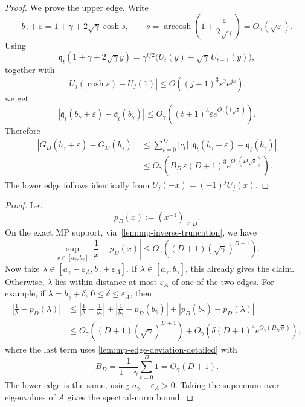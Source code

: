 \documentclass[12pt]{article}
\newcommand{\gam}{\gamma}
\DeclareMathOperator{\arccosh}{arccosh}
\newcommand{\q}{\mathfrak q}
\begin{document}
\begin{proof}
We prove the upper edge. Write
\[
    b_\gam+\varepsilon
    =
    1+\gam+2\sqrt{\gam}\cosh s,
    \qquad
    s=\arccosh\!\left(1+\frac{\varepsilon}{2\sqrt{\gam}}\right)
    =
    O_\gam(\sqrt{\varepsilon}).
\]
Using
\[
    \q_t(1+\gam+2\sqrt{\gam}y)
    =
    \gam^{t/2}\bigl(U_t(y)+\sqrt{\gam}\,U_{t-1}(y)\bigr),
\]
together with
\[
    |U_j(\cosh s)-U_j(1)|
    \le
    O\!\left((j+1)^3s^2 e^{js}\right),
\]
we get
\[
    |\q_t(b_\gam+\varepsilon)-\q_t(b_\gam)|
    \le
    O_\gam\!\left(
        (t+1)^3\varepsilon e^{O_\gam(t\sqrt{\varepsilon})}
    \right).
\]
Therefore
\[
\begin{aligned}
    |G_D(b_\gam+\varepsilon)-G_D(b_\gam)|
    &\le
    \sum_{t=0}^D |c_t|\,
    |\q_t(b_\gam+\varepsilon)-\q_t(b_\gam)| \\
    &\le
    O_\gam\!\left(
        B_D\,\varepsilon (D+1)^3 e^{O_\gam(D\sqrt{\varepsilon})}
    \right).
\end{aligned}
\]
The lower edge follows identically from \(U_j(-x)=(-1)^jU_j(x)\).
\end{proof}

\mpinverseedgefluctuation*
\begin{proof}
Let
\[
    p_D(x):=(x^{-1})_{\le D}.
\]
On the exact MP support, via~\cref{lem:mp-inverse-truncation}, we have
\[
    \sup_{x\in[a_\gam,b_\gam]}
    \left|
        \frac1x-p_D(x)
    \right|
    \le
    O_\gam\!\left((D+1)(\sqrt{\gam})^{D+1}\right).
\]
Now take \(\lambda\in[a_\gam-\varepsilon_A,b_\gam+\varepsilon_A]\). If \(\lambda\in[a_\gam,b_\gam]\), this already gives the claim. Otherwise, \(\lambda\) lies within distance at most \(\varepsilon_A\) of one of the two edges. For example, if \(\lambda=b_\gam+\delta\), \(0\le\delta\le\varepsilon_A\), then
\[
\begin{aligned}
    \left|\frac1\lambda-p_D(\lambda)\right|
    &\le
    \left|\frac1\lambda-\frac1{b_\gam}\right|
    +
    \left|\frac1{b_\gam}-p_D(b_\gam)\right|
    +
    |p_D(b_\gam)-p_D(\lambda)| \\
    &\le
    O_\gam\!\left((D+1)(\sqrt{\gam})^{D+1}\right)
    +
    O_\gam\!\left(
        \delta (D+1)^4 e^{O_\gam(D\sqrt{\delta})}
    \right),
\end{aligned}
\]
where the last term uses \cref{lem:mp-edge-deviation-detailed} with
\[
    B_D=\frac{1}{1-\gam}\sum_{t=0}^D 1=O_\gam(D+1).
\]
The lower edge is the same, using \(a_\gam-\varepsilon_A>0\). Taking the supremum over eigenvalues of \(A\) gives the spectral-norm bound.
\end{proof}
\end{document}

